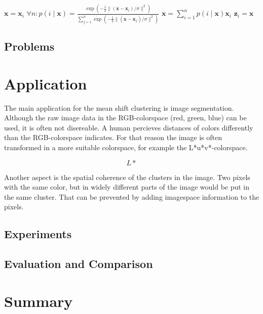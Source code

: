 \documentclass{article}
\begin{document}
\begin{algorithmic}
		\State $\bm{x} = \bm{x}_i$
		\Repeat
			\State $\forall n: p(i \mid \bm{x}) = \frac{\exp(-\frac{1}{2} \lVert (\bm{x} - \bm{x}_i) / \sigma \rVert^2)}{\sum_{j=1}^n \exp(-\frac{1}{2} \lVert (\bm{x} - \bm{x}_j) / \sigma \rVert^2)}$
			\State $\bm{x} = \sum_{i=1}^n p(i \mid \bm{x}) \bm{x}_i$
		\State $\bm{z}_i = \bm{x}$
	\EndFor
	\State \Return {}
	\EndFunction
\end{algorithmic}


\subsection{Problems}


\section{Application}

The main application for the mean shift clustering is image segmentation. Although the raw image data in the RGB-colorspace (red, green, blue) can be used, it is often not disereable. A human percieves distances of colors differently than the RGB-colorspace indicates. For that reason the image is often transformed in a more suitable colorspace, for example the L*u*v*-colorspace.

\[
L*
\]

Another aspect is the spatial coherence of the clusters in the image. Two pixels with the same color, but in widely different parts of the image would be put in the same cluster. That can be prevented by adding imagespace information to the pixels. 

\subsection{Experiments}



\subsection{Evaluation and Comparison}

\section{Summary}
\end{document}
